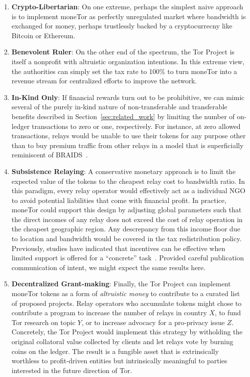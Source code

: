 \begin{enumerate}

\item \textbf{Crypto-Libertarian}: On one extreme, perhaps the simplest naive
approach is to implement moneTor as perfectly unregulated market where bandwidth
is exchanged for money, perhaps trustlessly backed by a cryptocurrecny like
Bitcoin or Ethereum.

\item \textbf{Benevolent Ruler}: On the other end of the spectrum, the Tor
Project is itself a nonprofit with altruistic organization intentions. In this
extreme view, the authorities can simply set the tax rate to 100\% to turn
moneTor into a revenue stream for centralized efforts to improve the network.

\item \textbf{In-Kind Only}: If financial rewards turn out to be prohibitive, we can
mimic several of the purely in-kind nature of non-transferable and transferable
benefits described in Section~\ref{sec:related_work} by limiting the number of
on-ledger transactions to zero or one, respectively. For instance, at zero
allowed transactions, relays would be unable to use their tokens for any purpose
other than to buy premium traffic from other relays in a model that is
superficially reminiscent of BRAIDS~\cite{jansen2010recruiting}.

\item \textbf{Subsistence Relaying}: A conservative monetary approach is to limit the
expected value of the tokens to the cheapest relay cost to bandwidth ratio. In this 
paradigm,
every relay operator would effectively act as a individual NGO to avoid
potential liabilities that come with financial profit. In practice, moneTor
could support this design by adjusting global parameters such that the direct
incomes of any relay does not exceed the cost of relay operation in the cheapest
geographic region. Any descrepancy from this income floor due to location and
bandwidth would be covered in the tax redistribution policy. Previously, studies
have indicated that incentives can be effective when limited support is offered
for a ``concrete'' task~\cite{10.1257/jep.25.4.191, 10.1086/431263}. Provided
careful publication communication of intent, we might expect the same results
here.

\item \textbf{Decentralized Grant-making}: Finally, the Tor Project can
implement moneTor tokens as a form of \emph{altruistic money} to contribute to a
curated list of proposed projects. Relay operators who accumulate tokens might
chose to contribute a program to increase the number of relays in country $X$,
to fund Tor research on topic $Y$, or to increase advocacy for a pro-privacy
issue $Z$. Concretely, the Tor Project would implement this strategy by
witholding the original collatoral value collected by clients and let relays
vote by burning coins on the ledger. The result is a fungible asset that is
extrinsically worthless to profit-driven entities but intrinsically meaningful
to parties interested in the future direction of Tor.

\end{enumerate}

